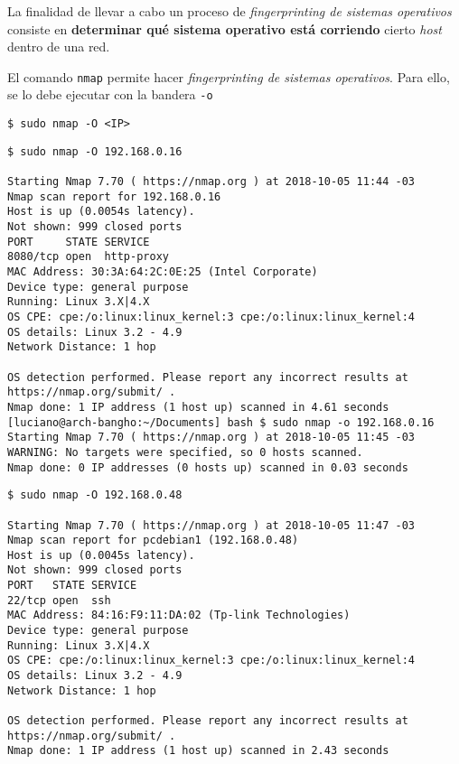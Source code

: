 La finalidad de llevar a cabo un proceso de \emph{fingerprinting de sistemas operativos} consiste en \textbf{determinar qué sistema operativo está corriendo} cierto \emph{host} dentro de una red.   

El comando \texttt{nmap} permite hacer \emph{fingerprinting de sistemas operativos}. Para ello, se lo debe ejecutar con la bandera \texttt{-o}   

\begin{lstlisting}[title={Se debe ejecutar el comando con privilegios de superusuario}]
$ sudo nmap -O <IP>
\end{lstlisting}

\begin{lstlisting}[title={\emph{OS Fingerprinting} a un Ubuntu 16.04}]
$ sudo nmap -O 192.168.0.16

Starting Nmap 7.70 ( https://nmap.org ) at 2018-10-05 11:44 -03
Nmap scan report for 192.168.0.16
Host is up (0.0054s latency).
Not shown: 999 closed ports
PORT     STATE SERVICE
8080/tcp open  http-proxy
MAC Address: 30:3A:64:2C:0E:25 (Intel Corporate)
Device type: general purpose
Running: Linux 3.X|4.X
OS CPE: cpe:/o:linux:linux_kernel:3 cpe:/o:linux:linux_kernel:4
OS details: Linux 3.2 - 4.9
Network Distance: 1 hop

OS detection performed. Please report any incorrect results at https://nmap.org/submit/ .
Nmap done: 1 IP address (1 host up) scanned in 4.61 seconds
[luciano@arch-bangho:~/Documents] bash $ sudo nmap -o 192.168.0.16
Starting Nmap 7.70 ( https://nmap.org ) at 2018-10-05 11:45 -03
WARNING: No targets were specified, so 0 hosts scanned.
Nmap done: 0 IP addresses (0 hosts up) scanned in 0.03 seconds
\end{lstlisting}

\begin{lstlisting}[title={\emph{OS Fingerprinting} a un Debian 9}]
$ sudo nmap -O 192.168.0.48

Starting Nmap 7.70 ( https://nmap.org ) at 2018-10-05 11:47 -03
Nmap scan report for pcdebian1 (192.168.0.48)
Host is up (0.0045s latency).
Not shown: 999 closed ports
PORT   STATE SERVICE
22/tcp open  ssh
MAC Address: 84:16:F9:11:DA:02 (Tp-link Technologies)
Device type: general purpose
Running: Linux 3.X|4.X
OS CPE: cpe:/o:linux:linux_kernel:3 cpe:/o:linux:linux_kernel:4
OS details: Linux 3.2 - 4.9
Network Distance: 1 hop

OS detection performed. Please report any incorrect results at https://nmap.org/submit/ .
Nmap done: 1 IP address (1 host up) scanned in 2.43 seconds
\end{lstlisting}


